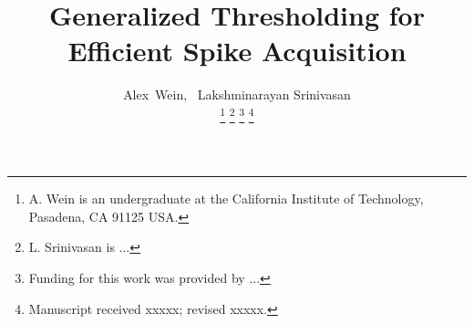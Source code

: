 \documentclass[journal]{IEEEtran}
\begin{document}
%
\title{Generalized Thresholding for Efficient Spike Acquisition}
%
%
%

\author{Alex~Wein, ~Lakshminarayan Srinivasan%

\thanks{A. Wein is an undergraduate at the California Institute of Technology, Pasadena, CA 91125 USA.}%
\thanks{L. Srinivasan is ...}%
\thanks{Funding for this work was provided by ...}%
\thanks{Manuscript received xxxxx; revised xxxxx.}}

% 
%
\end{document}
